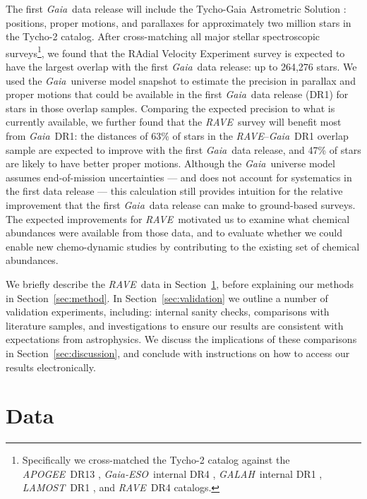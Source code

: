 \documentclass[preprint]{aastex}
\newcommand{\acronym}[1]{{\small{#1}}}
\newcommand{\project}[1]{\textsl{#1}}
\newcommand{\gaia}{\project{Gaia}}
\newcommand{\rave}{\project{\acronym{RAVE}}}
\newcommand{\galah}{\project{\acronym{GALAH}}}
\newcommand{\ges}{\project{Gaia-ESO}}
\newcommand{\apogee}{\project{\acronym{APOGEE}}}
\newcommand{\lamost}{\project{\acronym{LAMOST}}}
\newcommand{\tgas}{\project{\acronym{TGAS}}}
\begin{document}
The first \gaia\ data release will include the Tycho-Gaia Astrometric Solution
\citep[hereafter \tgas;][]{Michalik_2015a,Michalik_2015b}: positions, proper 
motions, and parallaxes for approximately two million stars in the Tycho-2 
\citep{Hog_2000} catalog.  After cross-matching all major stellar spectroscopic 
surveys\footnote{Specifically we cross-matched the Tycho-2 catalog against the 
\apogee\ DR13 \citep{Zasowski_2013}, \ges\ internal DR4 
\citep{Gilmore_2012,Randich_2013}, \galah\ internal DR1 \citep{DeSilva_2015}, 
\lamost\ DR1 \citep{Cui_2012}, and \rave\ DR4 \citep{Steinmetz_2006} catalogs.}, 
we found that the RAdial Velocity Experiment \citep[\rave;][]{Steinmetz_2006} 
survey is expected to have the largest overlap with the first \gaia\ 
data release: up to 264,276 stars.  We used the \gaia\ universe model snapshot 
\citep{Robin_2012} to estimate the precision in parallax and proper motions that
could be available in the first \gaia\ data release (DR1) for stars in those 
overlap samples.  Comparing the expected precision to what is currently available, 
we further found that the \rave\ survey will benefit most from \gaia\ DR1: the
distances of 63\% of stars in the \rave--\gaia\ DR1 overlap sample are expected 
to improve with the first \gaia\ data release, and 47\% of stars are likely to
have better proper motions.  Although the \gaia\ universe model assumes 
end-of-mission uncertainties --- and does not account for systematics in the 
first data release --- this calculation still provides intuition for the relative
improvement that the first \gaia\ data release can make to ground-based surveys.  
The expected improvements for \rave\ motivated us to examine what chemical 
abundances were available from those data, and to evaluate whether we could 
enable new chemo-dynamic studies by contributing to the existing set of chemical
abundances.


We briefly describe the \rave\ data in Section~\ref{sec:data}, before explaining
our methods in Section~\ref{sec:method}.  In Section~\ref{sec:validation}
we outline a number of validation experiments, including: internal sanity checks,
comparisons with literature samples, and investigations to ensure our results
are consistent with expectations from astrophysics.  We discuss the implications
of these comparisons in Section~\ref{sec:discussion}, and conclude with instructions
on how to access our results electronically.


\section{Data}
\label{sec:data}
\end{document}
